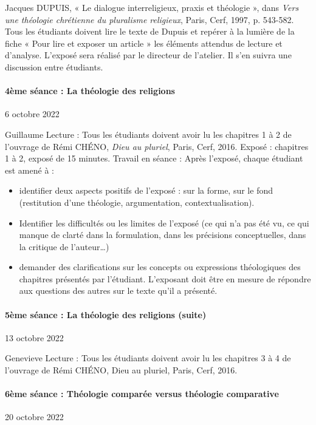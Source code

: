 Jacques DUPUIS, « Le dialogue interreligieux, praxis et théologie », dans \textit{Vers une théologie chrétienne du pluralisme religieux}, Paris, Cerf, 1997, p. 543-582.
Tous les étudiants doivent lire le texte de Dupuis et repérer à la lumière de la fiche « Pour lire et exposer un article » les éléments attendus de lecture et d’analyse. 
L’exposé sera réalisé par le directeur de l’atelier. 
Il s’en suivra une discussion entre étudiants. 

\paragraph{4ème séance : La théologie des religions }   6 octobre 2022

Guillaume
Lecture : Tous les étudiants doivent avoir lu les chapitres 1 à 2 de l’ouvrage de Rémi CHÉNO, \textit{Dieu au pluriel}, Paris, Cerf, 2016. 
Exposé : chapitres 1 à 2,  exposé de 15 minutes. 
Travail en séance : Après l’exposé, chaque étudiant est amené à : 
\begin{itemize}
    \item 	identifier deux aspects positifs de l’exposé : sur la forme, sur le fond (restitution d’une théologie, argumentation, contextualisation). 
\item	Identifier les difficultés ou les limites de l’exposé (ce qui n’a pas été vu, ce qui manque de clarté dans la formulation, dans les précisions conceptuelles, dans la critique de l’auteur…)
\item	demander des clarifications sur les concepts ou expressions théologiques des chapitres présentés par l’étudiant. L’exposant doit être en mesure de répondre aux questions des autres sur le texte qu’il a présenté. 
\end{itemize}


\paragraph{5ème séance : La théologie des religions (suite) }   13 octobre 2022

Genevieve
Lecture : Tous les étudiants doivent avoir lu les chapitres 3 à 4 de l’ouvrage de Rémi CHÉNO, Dieu au pluriel, Paris, Cerf, 2016. 


\paragraph{6ème séance : Théologie comparée versus théologie comparative}    20 octobre 2022 

